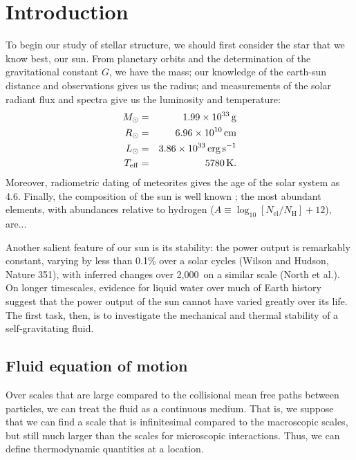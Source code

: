 \newcommand{\sun}{\ensuremath{\odot}}
\newcommand{\Rsun}{\ensuremath{R_{\sun}}}
\chapter{Introduction}
\newcommand{\vu}{\ensuremath{\bvec{u}}}
\newcommand{\vx}{\ensuremath{\bvec{x}}}
\newcommand{\vr}{\ensuremath{\bvec{r}}}


To begin our study of stellar structure, we should first consider the star that we know best, our sun.  From planetary orbits and the determination of the gravitational constant $G$, we have the mass; our knowledge of the earth-sun distance and observations gives us the radius; and measurements of the solar radiant flux and spectra give us the luminosity and temperature:
\begin{eqnarray}
M_{\sun} &=& 1.99\ee{33}\nsp\gram\\
R_{\sun} &=& 6.96\ee{10}\nsp\cm\\
L_{\sun} &=& 3.86\ee{33}\nsp\ergspersecond\\
T_{\mathrm{eff}} &=& 5780\nsp\K.
\end{eqnarray}
Moreover, radiometric dating of meteorites gives the age of the solar system as 4.6\nsp\Giga\yr.  Finally, the composition of the sun is well known \citep{anders.grevesse:abundances}; the most abundant elements, with abundances relative to hydrogen ($A \equiv \log_{10}[N_{\mathrm{el}}/N_{\mathrm{H}}] + 12$), are...

Another salient feature of our sun is its stability: the power output is remarkably constant, varying by less than 0.1\% over a solar cycles (Wilson and Hudson, Nature 351), with inferred changes over 2,000\nsp\yr\ on a similar scale (North et al.).  On longer timescales, evidence for liquid water over much of Earth history suggest that the power output of the sun cannot have varied greatly over its life.  The first task, then, is to investigate the mechanical and thermal stability of a self-gravitating fluid.

\section{Fluid equation of motion}

Over scales that are large compared to the collisional mean free paths between particles, we can treat the fluid as a continuous medium.  That is, we suppose that we can find a scale that is infinitesimal compared to the macroscopic scales, but still much larger than the scales for microscopic interactions. Thus, we can define thermodynamic quantities at a location.

